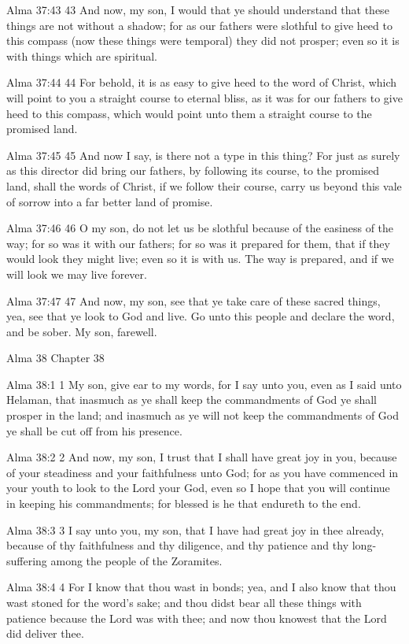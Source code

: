 Alma 37:43
 43 And now, my son, I would that ye should understand that these
things are not without a shadow; for as our fathers were slothful
to give heed to this compass (now these things were temporal)
they did not prosper; even so it is with things which are
spiritual.

Alma 37:44
 44 For behold, it is as easy to give heed to the word of Christ,
which will point to you a straight course to eternal bliss, as it
was for our fathers to give heed to this compass, which would
point unto them a straight course to the promised land.

Alma 37:45
 45 And now I say, is there not a type in this thing? For just
as surely as this director did bring our fathers, by following
its course, to the promised land, shall the words of Christ, if
we follow their course, carry us beyond this vale of sorrow into
a far better land of promise.

Alma 37:46
 46 O my son, do not let us be slothful because of the easiness
of the way; for so was it with our fathers; for so was it
prepared for them, that if they would look they might live; even
so it is with us. The way is prepared, and if we will look we
may live forever.

Alma 37:47
 47 And now, my son, see that ye take care of these sacred
things, yea, see that ye look to God and live. Go unto this
people and declare the word, and be sober. My son, farewell.

Alma 38
Chapter 38

Alma 38:1
 1 My son, give ear to my words, for I say unto you, even as I
said unto Helaman, that inasmuch as ye shall keep the
commandments of God ye shall prosper in the land; and inasmuch as
ye will not keep the commandments of God ye shall be cut off from
his presence.

Alma 38:2
 2 And now, my son, I trust that I shall have great joy in you,
because of your steadiness and your faithfulness unto God; for as
you have commenced in your youth to look to the Lord your God,
even so I hope that you will continue in keeping his
commandments; for blessed is he that endureth to the end.

Alma 38:3
 3 I say unto you, my son, that I have had great joy in thee
already, because of thy faithfulness and thy diligence, and thy
patience and thy long-suffering among the people of the
Zoramites.

Alma 38:4
 4 For I know that thou wast in bonds; yea, and I also know that
thou wast stoned for the word's sake; and thou didst bear all
these things with patience because the Lord was with thee; and
now thou knowest that the Lord did deliver thee.

